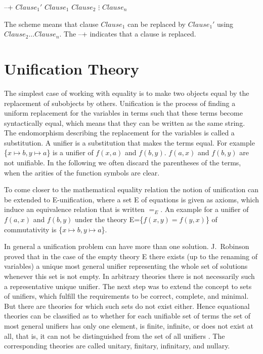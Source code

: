 \begin{Def}
\return\vspace{-3mm}
\label{ReductionRuleScheme}

\hlineblockfour%
{--+}%
{$Clause_1'$}%
{$Clause_1$}%
{$Clause_2$}%
{$\vdots$}%
{$Clause_n$}

The scheme means that clause $Clause_1$ can be replaced by $Clause_1'$ using $Clause_2
\dots Clause_n$. The --+ indicates that a clause is replaced.
\end{Def}


\section{Unification Theory}
\label{UnificationTheory}

The simplest case of working with equality is
to make two
objects equal by the replacement of subobjects by others.
Unification is the process of finding
a uniform replacement for the variables in terms such that
these terms become syntactically equal, which means that
they can be written as the same string. The endomorphism
describing the replacement for the variables is called
a substitution. A unifier is a
substitution that makes the terms equal. For example
\{$x \mapsto b, y \mapsto a$\}
is a unifier of $f(x,a)$ and $f(b,y)$. $f(a,x)$ and $f(b,y)$ are 
not unifiable. In the following we often
discard the parentheses of the terms, when the arities of the function
symbols are clear.

To come closer to the mathematical equality relation the
notion of unification can be extended to E-unification,
where a set E of equations is given as axioms, which
induce an equivalence relation that is written
$=_E$. An example for a unifier of
$f(a,x)$ and $f(b,y)$ under the theory E=\{$f(x,y)=f(y,x)$\} of
commutativity is \{$x \mapsto b, y \mapsto a$\}.

In general a unification problem can have more than one
solution. J.\ Robinson \cite{Robinson65a} proved that in the 
case of the empty theory E there exists (up to the renaming of variables)
a unique most general
unifier  representing the whole set of solutions whenever
this set is not empty. In arbitrary theories there is not necessarily
such a representative unique unifier. The next step was to extend the 
concept to sets of unifiers, which fulfill the 
requirements to be correct, complete,
and minimal. But there are theories for which such sets do not exist
either.
Hence equational theories can be classified as to
whether for each unifiable set of terms 
the set of most general unifiers
has only one element, is finite, infinite,
or does not exist at all, that is, it can not be
distinguished from the set of all unifiers \cite{Siekmann88}. The
corresponding theories are called unitary,
finitary, infinitary, and nullary. \goodbreak

